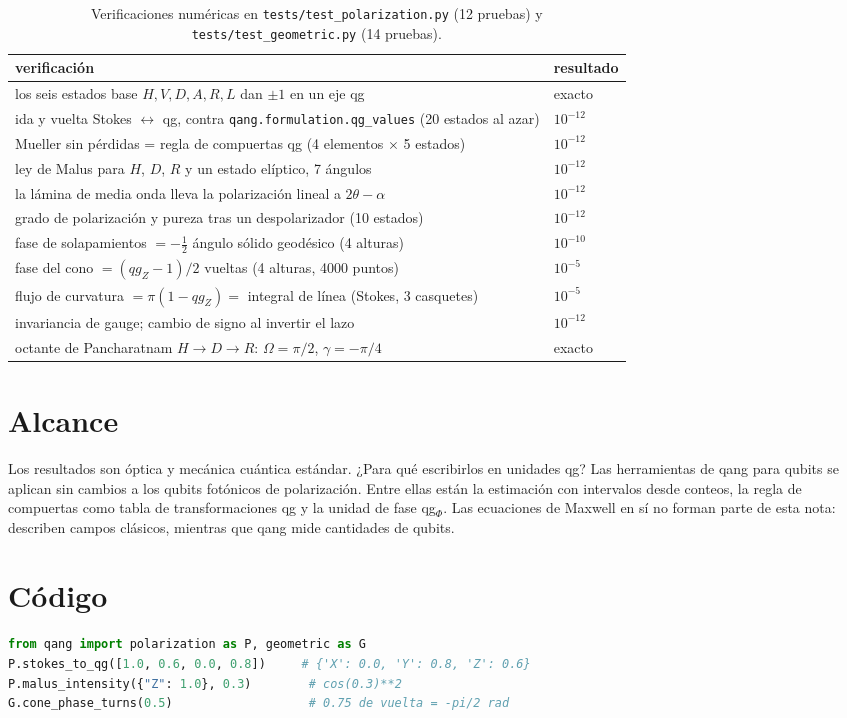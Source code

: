 \documentclass[11pt]{article}
\begin{document}
\begin{table}[h]
\centering\small
\begin{tabular}{p{}l}
\toprule
verificación & resultado\\
\midrule
los seis estados base $H,V,D,A,R,L$ dan $\pm1$ en un eje qg & exacto\\
ida y vuelta Stokes $\leftrightarrow$ qg, contra \texttt{qang.formulation.qg\_values} (20 estados al azar) & $10^{-12}$\\
Mueller sin pérdidas = regla de compuertas qg (4 elementos $\times$ 5 estados) & $10^{-12}$\\
ley de Malus para $H$, $D$, $R$ y un estado elíptico, 7 ángulos & $10^{-12}$\\
la lámina de media onda lleva la polarización lineal a $2\theta-\alpha$ & $10^{-12}$\\
grado de polarización y pureza tras un despolarizador (10 estados) & $10^{-12}$\\
fase de solapamientos $=-\tfrac12$ ángulo sólido geodésico (4 alturas) & $10^{-10}$\\
fase del cono $=(qg_Z-1)/2$ vueltas (4 alturas, 4000 puntos) & $10^{-5}$\\
flujo de curvatura $=\pi(1-qg_Z)=$ integral de línea (Stokes, 3 casquetes) & $10^{-5}$\\
invariancia de gauge; cambio de signo al invertir el lazo & $10^{-12}$\\
octante de Pancharatnam $H\to D\to R$: $\Omega=\pi/2$, $\gamma=-\pi/4$ & exacto\\
\bottomrule
\end{tabular}
\caption{Verificaciones numéricas en \texttt{tests/test\_polarization.py} (12 pruebas) y
\texttt{tests/test\_geometric.py} (14 pruebas).}
\end{table}

\section{Alcance}

Los resultados son óptica y mecánica cuántica estándar. ¿Para qué escribirlos en unidades qg? Las herramientas
de qang para qubits se aplican sin cambios a los qubits fotónicos de polarización. Entre ellas están la
estimación con intervalos desde conteos, la regla de compuertas como tabla de transformaciones qg y la unidad
de fase qg$_\Phi$. Las ecuaciones de Maxwell en sí no forman parte de esta nota: describen campos clásicos,
mientras que qang mide cantidades de qubits.

\section*{Código}

\begin{lstlisting}[language=Python]
from qang import polarization as P, geometric as G
P.stokes_to_qg([1.0, 0.6, 0.0, 0.8])     # {'X': 0.0, 'Y': 0.8, 'Z': 0.6}
P.malus_intensity({"Z": 1.0}, 0.3)        # cos(0.3)**2
G.cone_phase_turns(0.5)                   # 0.75 de vuelta = -pi/2 rad
\end{lstlisting}



\end{document}
